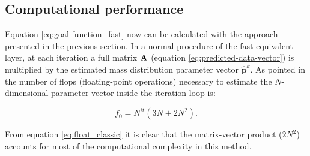 \documentclass[paper]{geophysics}
\begin{document}








\subsection{Computational performance}
Equation \ref{eq:goal-function_fast} now can be calculated with the approach presented in the previous section. In a normal procedure of the fast equivalent layer, at each iteration a full matrix $\tensor{A}$ (equation \ref{eq:predicted-data-vector}) is multiplied by the estimated mass distribution parameter vector $\hat{\mathbf{p}}^k$. As pointed in \cite{siqueira2017fast} the number of flops (floating-point operations) necessary to estimate the $N$-dimensional parameter vector inside the iteration loop is:

\begin{equation}
f_0 = N^{it} (3N + 2N^2).
\label{eq:float_classic}
\end{equation}

From equation \ref{eq:float_classic} it is clear that the matrix-vector product ($2N^2$) accounts for most of the computational complexity in this method.
\end{document}
